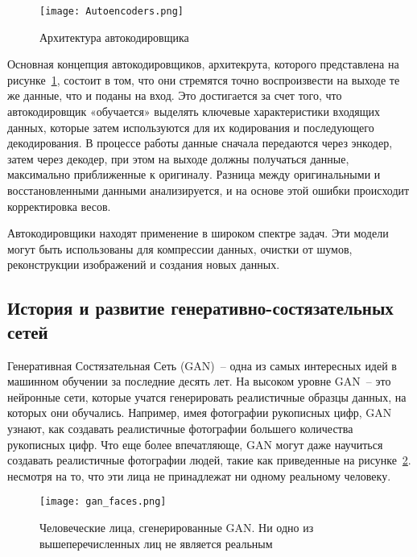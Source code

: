 \begin{figure}[ht]
    \centering
    \texttt{[image: Autoencoders.png]}
    \caption{Архитектура автокодировщика}
    \label{domain::autoencoders}
\end{figure}

Основная концепция автокодировщиков, архитекрута, которого представлена на рисунке~\ref{domain::autoencoders}, состоит в том, что они стремятся точно воспроизвести на выходе те же данные, что и поданы на вход. Это достигается за счет того, что автокодировщик «обучается» выделять ключевые характеристики входящих данных, которые затем используются для их кодирования и последующего декодирования. В процессе работы данные сначала передаются через энкодер, затем через декодер, при этом на выходе должны получаться данные, максимально приближенные к оригиналу. Разница между оригинальными и восстановленными данными анализируется, и на основе этой ошибки происходит корректировка весов.

Автокодировщики находят применение в широком спектре задач. Эти модели могут быть использованы для компрессии данных, очистки от шумов, реконструкции изображений и создания новых данных.

\subsection{История и развитие генеративно-состязательных сетей}

Генеративная Состязательная Сеть (GAN)~-- одна из самых интересных идей в машинном обучении за последние десять лет. На высоком уровне GAN~-- это нейронные сети, которые учатся генерировать реалистичные образцы данных, на которых они обучались. Например, имея фотографии рукописных цифр, GAN узнают, как создавать реалистичные фотографии большего количества рукописных цифр. Что еще более впечатляюще, GAN могут даже научиться создавать реалистичные фотографии людей, такие как приведенные на рисунке~\ref{domain::gan_faces}. несмотря на то, что эти лица не принадлежат ни одному реальному человеку.

\begin{figure}[ht]
    \centering
    \texttt{[image: gan\_faces.png]}
    \caption{Человеческие лица, сгенерированные GAN. Ни одно из вышеперечисленных лиц не является реальным}
    \label{domain::gan_faces}
\end{figure}

